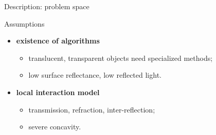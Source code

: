 \documentclass[10pt]{beamer}
\begin{document}
\begin{frame}{Description: problem space}
\begin{exampleblock}{Assumptions}

\begin{itemize}
\item \textbf{existence of algorithms}
  \begin{itemize}
  \item translucent, transparent objects need specialized methods;
  \item low surface reflectance, low reflected light.
  \end{itemize}
\item \textbf{local interaction model}
  \begin{itemize}
  \item transmission, refraction, inter-reflection;
  \item severe concavity.
  \end{itemize}
\end{itemize}

\end{exampleblock}

\end{frame}
\end{document}

